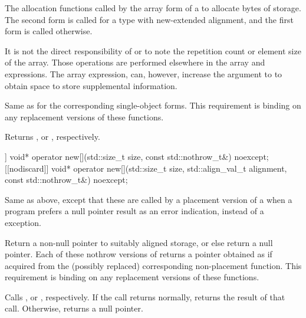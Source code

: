 \begin{itemdescr}
\pnum
\effects
The
allocation functions
called by the array form of a
to allocate
 bytes of storage.
The second form is called for a type with new-extended alignment, and
the first form is called otherwise.
\begin{footnote}
It is not the direct responsibility of
or
to note the repetition count or element size of the array.
Those operations are performed elsewhere in the array
and
expressions.
The array
expression, can, however, increase the  argument to
to obtain space to store supplemental information.
\end{footnote}

\pnum
\replaceable
{}

\pnum
\required
Same as for
the corresponding single-object forms.
This requirement is binding on any replacement versions of these functions.

\pnum
{}
Returns
,
or
,
respectively.
\end{itemdescr}

%
\begin{itemdecl}
[[nodiscard]] void* operator new[](std::size_t size, const std::nothrow_t&) noexcept;
[[nodiscard]] void* operator new[](std::size_t size, std::align_val_t alignment,
                                   const std::nothrow_t&) noexcept;
\end{itemdecl}

\begin{itemdescr}
\pnum
\effects
Same as above, except that these are called by a placement version of a
when a \Cpp{} program prefers a null pointer result as an error indication,
instead of a
exception.

\pnum
\replaceable
{}

\pnum
\required
Return a non-null pointer to suitably aligned storage,
or else return a null pointer.
Each of these nothrow versions of
returns a pointer obtained as if
acquired from the (possibly replaced)
corresponding non-placement function.
This requirement is binding on any replacement versions of these functions.

\pnum
{}
Calls ,
or ,
respectively.
If the call returns normally,
returns the result of that call.
Otherwise, returns a null pointer.
\end{itemdescr}

